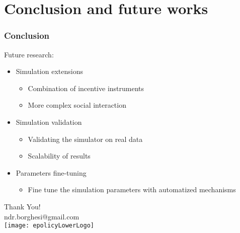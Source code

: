 \documentclass{beamer}
\begin{document}
	
 	
	\section{Conclusion and future works}
	
	\begin{frame}
	\frametitle{Conclusion}
	Future research:
	\begin{itemize}
		\item Simulation extensions
		\begin{itemize}
			\item Combination of incentive instruments
			\item More complex social interaction
		\end{itemize}
		\item Simulation validation
		\begin{itemize}
			\item Validating the simulator on real data
			\item Scalability of results
		\end{itemize}
		\item Parameters fine-tuning
		\begin{itemize}
			\item Fine tune the simulation parameters with automatized mechanisms
		\end{itemize}
	\end{itemize}
	\end{frame}
	
	\begin{frame}
      \begin{center}
        Thank You!\\
        ndr.borghesi@gmail.com\\
        \bigskip \bigskip \bigskip \bigskip 
        \texttt{[image: epolicyLowerLogo]}
      \end{center}
       
    \end{frame}
\end{document}
